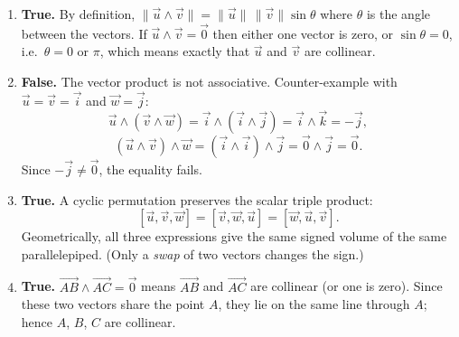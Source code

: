 \documentclass[11pt]{article}
\begin{document}
\begin{corrige}
\begin{enumerate}
\item \textbf{True.} By definition, $\|\vec{u} \wedge \vec{v}\| = \|\vec{u}\|\,\|\vec{v}\|\sin\theta$ where $\theta$ is the angle between the vectors. If $\vec{u} \wedge \vec{v} = \vec{0}$ then either one vector is zero, or $\sin\theta = 0$, i.e.\ $\theta = 0$ or $\pi$, which means exactly that $\vec{u}$ and $\vec{v}$ are collinear.
\item \textbf{False.} The vector product is not associative. Counter-example with $\vec{u} = \vec{v} = \vec{i}$ and $\vec{w} = \vec{j}$:
\[
\vec{u} \wedge (\vec{v} \wedge \vec{w}) = \vec{i} \wedge (\vec{i} \wedge \vec{j}) = \vec{i} \wedge \vec{k} = -\vec{j},
\]
\[
(\vec{u} \wedge \vec{v}) \wedge \vec{w} = (\vec{i} \wedge \vec{i}) \wedge \vec{j} = \vec{0} \wedge \vec{j} = \vec{0}.
\]
Since $-\vec{j} \neq \vec{0}$, the equality fails.
\item \textbf{True.} A cyclic permutation preserves the scalar triple product:
\[
[\vec{u}, \vec{v}, \vec{w}] = [\vec{v}, \vec{w}, \vec{u}] = [\vec{w}, \vec{u}, \vec{v}].
\]
Geometrically, all three expressions give the same signed volume of the same parallelepiped. (Only a \emph{swap} of two vectors changes the sign.)
\item \textbf{True.} $\vec{AB} \wedge \vec{AC} = \vec{0}$ means $\vec{AB}$ and $\vec{AC}$ are collinear (or one is zero). Since these two vectors share the point $A$, they lie on the same line through $A$; hence $A$, $B$, $C$ are collinear.
\end{enumerate}
\end{corrige}
\end{document}
